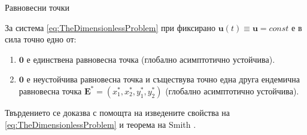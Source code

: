 \begin{frame}[t]{Равновесни точки}
  \begin{proposition}
    За система \eqref{eq:TheDimensionlessProblem} при фиксирано $\boldsymbol{u}(t) \equiv \boldsymbol{u} = const$ е в сила точно едно от:
    \begin{enumerate}
      \item $\pmb{0}$ е единствена равновесна точка (глобално асимптотично устойчива).
      \item $\pmb{0}$ е неустойчива равновесна точка и съществува точно една друга ендемична равновесна точка $\boldsymbol{E}^* = (x_1^*, x_2^*, y_1^*, y_2^*)$ (глобално асимптотично устойчива).
    \end{enumerate}
  \end{proposition}
  Твърдението се доказва с помощта на изведените свойства на \eqref{eq:TheDimensionlessProblem} и теорема на Smith .
\end{frame}
